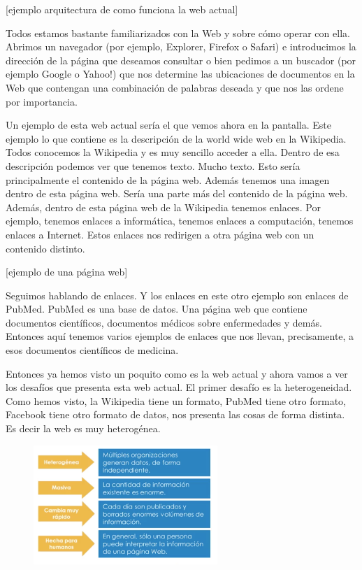  [ejemplo arquitectura de como funciona la web actual]
 
  Todos estamos bastante familiarizados con la Web y sobre cómo operar con ella. Abrimos un navegador (por ejemplo, Explorer, Firefox o Safari) e introducimos la dirección de la página que deseamos consultar o bien pedimos a un buscador (por ejemplo Google o Yahoo!) que nos determine las ubicaciones de documentos en la Web que contengan una combinación de palabras deseada y que nos las ordene por importancia.­ %
 
 Un ejemplo de esta web actual sería el que vemos ahora en la pantalla. Este ejemplo lo que contiene es la descripción de la world wide web en la Wikipedia. Todos conocemos la Wikipedia y es muy sencillo acceder a ella. Dentro de esa descripción podemos ver que tenemos texto. Mucho texto. Esto sería principalmente el contenido de la página web. Además tenemos una imagen dentro de esta página web. Sería una parte más del contenido de la página web. Además, dentro de esta página web de la Wikipedia tenemos enlaces. Por ejemplo, tenemos enlaces a informática, tenemos enlaces a computación, tenemos enlaces a Internet. Estos enlaces nos redirigen a otra página web con un contenido distinto.
 

 
 [ejemplo de una página web]
 
 
 Seguimos hablando de enlaces. Y los enlaces en este otro ejemplo son enlaces de PubMed. PubMed es una base de datos. Una página web que contiene documentos científicos, documentos médicos sobre enfermedades y demás. Entonces aquí tenemos varios ejemplos de enlaces que nos llevan, precisamente, a esos documentos científicos de medicina.
 
 
 Entonces ya hemos visto un poquito como es la web actual y ahora vamos a ver los desafíos que presenta esta web actual. El primer desafío es la heterogeneidad. Como hemos visto, la Wikipedia tiene un formato, PubMed tiene otro formato, Facebook tiene otro formato de datos, nos presenta las cosas de forma distinta. Es decir la web es muy heterogénea.
 
\begin{figure}[H]
	\centering
	\includegraphics[height=4.5cm]{imagenes/capitulo3/1}
	\caption{}
\end{figure}
 
